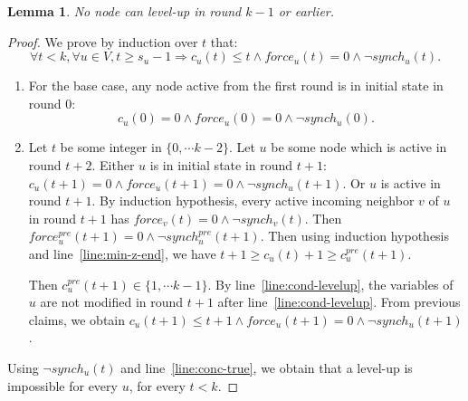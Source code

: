 \documentclass[11pt,letterpaper]{article}
\newtheorem{lem}[thm]{Lemma}
\begin{document}
\begin{lem} \label{lem:early-phase}
	No node can level-up in round $k-1$ or earlier.
\end{lem}
\begin{proof}
	We prove by induction over $t$ that:
	$$\forall t < k, \forall u \in V, t \geq s_u-1 \Rightarrow c_u(t) \leq t \wedge force_u(t) = 0 \wedge \neg synch_u(t).$$
	\begin{enumerate}
		\item For the base case, any node active from the first round is in initial state in round 0:
			$$c_u(0) = 0 \wedge force_u(0) = 0 \wedge \neg synch_u(0).$$
		\item Let $t$ be some integer in $\{0, \cdots k-2\}$. Let $u$ be some node which is active in round $t+2$.
			Either $u$ is in initial state in round $t+1$: $c_u(t+1) = 0 \wedge force_u(t+1) = 0 \wedge \neg synch_u(t+1)$.
			Or $u$ is active in round $t+1$.
			By induction hypothesis, every active incoming neighbor $v$ of $u$ in round $t+1$ has $force_v(t) = 0 \wedge \neg synch_v(t)$.
			Then $force_u^{pre}(t+1) = 0 \wedge \neg synch_u^{pre}(t+1)$.
			Then using induction hypothesis and line~\ref{line:min-z-end}, we have
			$t+1 \geq c_u(t)+1 \geq c_u^{pre}(t+1)$.

			Then $c_u^{pre}(t+1) \in \{1, \cdots k-1\}$.
			By line~\ref{line:cond-levelup}, the variables of $u$ are not modified in round $t+1$ after line~\ref{line:cond-levelup}.
			From previous claims, we obtain $c_u(t+1) \leq t+1 \wedge force_u(t+1) = 0 \wedge \neg synch_u(t+1)$.
	\end{enumerate}
	Using $\neg synch_u(t)$ and line~\ref{line:conc-true}, we obtain that a level-up is impossible for every $u$, for every $t < k$.
\end{proof}
\end{document}
